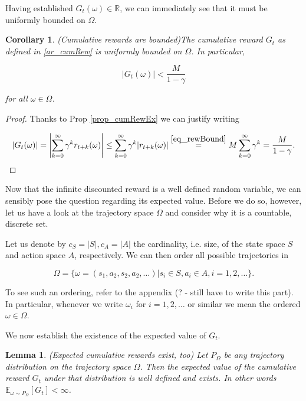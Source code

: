 \documentclass[11pt]{article} %
\newtheorem{lem}{Lemma}
\newtheorem{cor}{Corollary}
\begin{document}
Having established $G_t(\omega) \in \mathbb{R}$, we can immediately see that it must be uniformly bounded on $\Omega$.

\begin{cor}{(Cumulative rewards are bounded)}\label{cor_unifBoundCumRew}
	The cumulative reward $G_t$ as defined in \ref{ar_cumRew} is uniformly bounded on $\Omega$. In particular, 

	\begin{equation}\label{eq_boundCumRew}
		|G_t(\omega)| < \frac{M}{1 - \gamma}
	\end{equation}

	for all $\omega \in \Omega$.
\end{cor}

\begin{proof}
	Thanks to Prop \ref{prop_cumRewEx} we can justify writing

\begin{equation}
	|G_t(\omega)| = \left|\sum_{k=0}^{\infty} \gamma^k r_{t+k}(\omega) \right| \le \sum_{k=0}^{\infty} \gamma^k |r_{t+k}(\omega)| \overset{\ref{eq_rewBound}}{=} M \sum_{k=0}^{\infty} \gamma^k = \frac{M}{1 - \gamma}.
\end{equation}

\end{proof}

Now that the infinite discounted reward is a well defined random variable, we can sensibly pose the question regarding its expected value. Before we do so, however, let us have a look at the trajectory space $\Omega$ and consider why it is a countable, discrete set.

Let us denote by $c_S = |S|, c_A = |A|$ the cardinality, i.e. size, of the state space $S$ and action space $A$, respectively. We can then order all possible trajectories in 

\begin{equation}\label{def_traj}
	\Omega = \{ \omega = (s_1, a_2, s_2, a_2, \dots) | s_i \in S, a_i \in A, i=1,2,\dots \}.
\end{equation}

To see such an ordering, refer to the appendix (? - still have to write this part). In particular, whenever we write $\omega_i$ for $i = 1,2,\dots$ or similar we mean the ordered $\omega \in \Omega$.

We now establish the existence of the expected value of $G_t$.

\begin{lem}\label{lem_expCumRew}{(Expected cumulative rewards exist, too)}
	Let $P_\Omega$ be any trajectory distribution on the trajectory space $\Omega$. Then the expected value of the cumulative reward $G_t$ under that distribution is well defined and exists. In other words $\mathbb{E}_{\omega \sim P_{\Omega}}[G_t] < \infty$.
\end{lem}
\end{document}
